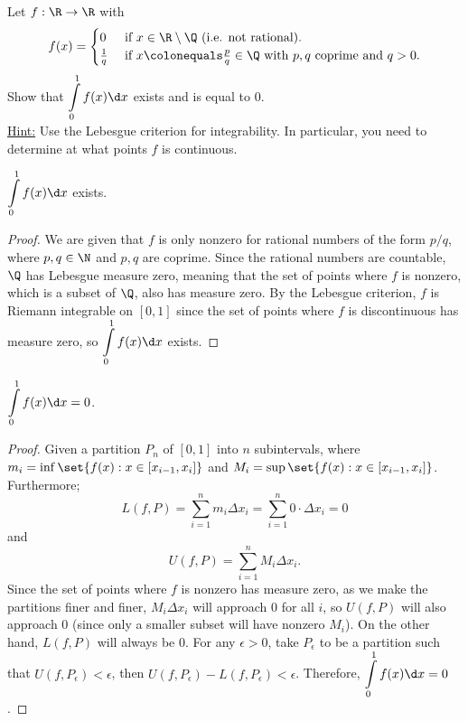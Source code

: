 \begin{problem}
  Let $f : \R \to \R$ with
    \[
      f(x) = \begin{cases}
        0 & \text{ if } x \in \R \setminus \Q \text{ (i.e. not rational).}\\
        \frac{1}{q} & \text{ if } x \colonequals \frac{p}{q} \in \Q
        \text{ with $p, q$ coprime and $q > 0$}.
      \end{cases}
    \]
  Show that $\displaystyle \int\limits_0^1 f(x) \d x$ exists and is equal to $0$.\\
  \underline{Hint:} Use the Lebesgue criterion for integrability.
    In particular, you need to determine at what points $f$ is continuous.
\end{problem}

  \begin{claim}
    $\displaystyle \int\limits_0^1 f(x) \d x$ exists.
  \end{claim}
  \begin{proof}
    We are given that $f$ is only nonzero for rational numbers of the form $p/q$,
    where $p, q \in \N$ and $p, q$ are coprime.
    Since the rational numbers are countable, $\Q$ has Lebesgue measure zero,
    meaning that the set of points where $f$ is nonzero,
    which is a subset of $\Q$, also has measure zero.
    By the Lebesgue criterion, $f$ is Riemann integrable on $[0, 1]$
    since the set of points where $f$ is discontinuous has measure zero,
    so $\displaystyle \int\limits_0^1 f(x) \d x$ exists.
  \end{proof}

  \begin{claim}
    $\displaystyle \int\limits_0^1 f(x) \d x = 0$.
  \end{claim}
  \begin{proof}
    Given a partition $P_n$ of $[0, 1]$ into $n$ subintervals,
    \blue{\[
      L(f, P) = \sum_{i=1}^n m_i \Delta x_i
              \leq \int \limits_0^1 f(x) \d x
              \leq \sum_{i=1}^n M_i \Delta x_i
              = U(f, P),
    \]}
    where $m_i = \inf\set{f(x) : x \in [x_{i-1}, x_i]}$ and
    $M_i = \sup\set{f(x) : x \in [x_{i-1}, x_i]}$.
    Furthermore;
    \begin{equation}
      L(f, P) = \sum_{i=1}^n m_i \Delta x_i
              = \sum_{i=1}^n 0 \cdot \Delta x_i
              = 0
    \end{equation}
    and
    \begin{equation}
      U(f, P) = \sum_{i=1}^n M_i \Delta x_i.
    \end{equation}
    Since the set of points where $f$ is nonzero has measure zero,
    as we make the partitions finer and finer, $M_i \Delta x_i$ will
    approach $0$ for all $i$, so $U(f, P)$ will also approach $0$
    (since only a smaller subset will have nonzero $M_i$).
    On the other hand, $L(f, P)$ will always be $0$.
    For any $\epsilon > 0$, take $P_\epsilon$ to be a partition such that
    $U(f, P_\epsilon) < \epsilon$, then $U(f, P_\epsilon) - L(f, P_\epsilon) < \epsilon$.
    Therefore, $\displaystyle \int\limits_0^1 f(x) \d x = 0$.
  \end{proof}
